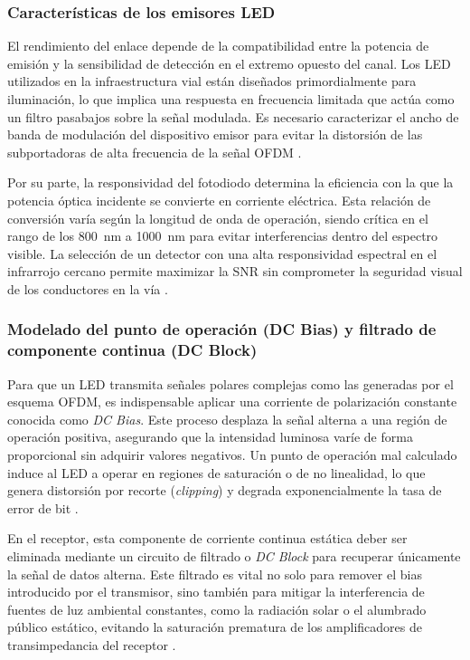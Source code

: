 \subsubsection{Características de los emisores LED}
El rendimiento del enlace depende de la compatibilidad entre la potencia de emisión y la sensibilidad de detección en el extremo opuesto del canal. Los LED utilizados en la infraestructura vial están diseñados primordialmente para iluminación, lo que implica una respuesta en frecuencia limitada que actúa como un filtro pasabajos sobre la señal modulada. Es necesario caracterizar el ancho de banda de modulación del dispositivo emisor para evitar la distorsión de las subportadoras de alta frecuencia de la señal OFDM \cite{islim2017modulation}.

Por su parte, la responsividad del fotodiodo determina la eficiencia con la que la potencia óptica incidente se convierte en corriente eléctrica. Esta relación de conversión varía según la longitud de onda de operación, siendo crítica en el rango de los 800~nm a 1000~nm para evitar interferencias dentro del espectro visible. La selección de un detector con una alta responsividad espectral en el infrarrojo cercano permite maximizar la SNR sin comprometer la seguridad visual de los conductores en la vía \cite{ghassemlooy2019optical}.

\subsubsection{Modelado del punto de operación (DC Bias) y filtrado de componente continua (DC Block)}
Para que un LED transmita señales polares complejas como las generadas por el esquema OFDM, es indispensable aplicar una corriente de polarización constante conocida como \textit{DC Bias}. Este proceso desplaza la señal alterna a una región de operación positiva, asegurando que la intensidad luminosa varíe de forma proporcional sin adquirir valores negativos. Un punto de operación mal calculado induce al LED a operar en regiones de saturación o de no linealidad, lo que genera distorsión por recorte (\textit{clipping}) y degrada exponencialmente la tasa de error de bit \cite{islim2017modulation}.

En el receptor, esta componente de corriente continua estática deber ser eliminada mediante un circuito de filtrado o \textit{DC Block} para recuperar únicamente la señal de datos alterna. Este filtrado es vital no solo para remover el bias introducido por el transmisor, sino también para mitigar la interferencia de fuentes de luz ambiental constantes, como la radiación solar o el alumbrado público estático, evitando la saturación prematura de los amplificadores de transimpedancia del receptor \cite{georlette2020visible}.


